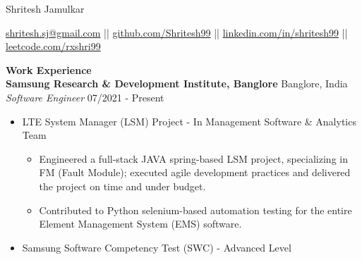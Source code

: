 \documentclass{article}
\begin{document}
\begin{center}

\LARGE Shritesh Jamulkar \\

\vspace{3pt}

\vspace{3pt}

\normalsize \href{mailto:shritesh.sj@gmail@gmail.com}{shritesh.sj@gmail.com} || \href{https://github.com/Shritesh99}{github.com/Shritesh99} || \href{https://linkedin.com/in/shritesh99}{linkedin.com/in/shritesh99} || \href{https://leetcode.com/rxshri99}{leetcode.com/rxshri99} \\
\end{center}

\noindent \large \textbf{\textcolor{NavyBlue}{Work Experience}} \vspace{3pt} \\
\noindent \normalsize \textbf{Samsung Research \& Development Institute, Banglore} \hfill Banglore, India  \\
\textit{Software Engineer} \hfill 07/2021 - Present
\begin{itemize}[noitemsep,nolistsep,leftmargin=*]
    \item {\normalsize {LTE System Manager (LSM) Project - In Management Software \& Analytics Team }
        \begin{itemize}
            \item Engineered a full-stack JAVA spring-based LSM project, specializing in FM (Fault Module); executed agile development practices and delivered the project on time and under budget.
            \item Contributed to Python selenium-based automation testing for the entire Element Management System (EMS) software.
        \end{itemize}
    }
    \item {\normalsize {Samsung Software Competency Test (SWC) - Advanced Level}}
\end{itemize}
\end{document}

